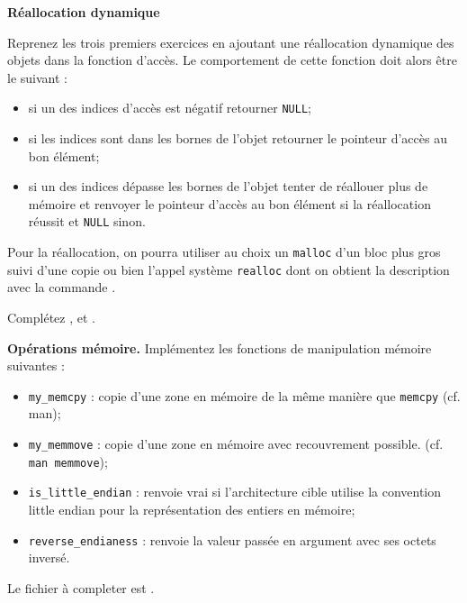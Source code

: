 \documentclass[10pt]{article}\usepackage[nu]{esial}
\begin{document}
\begin{Exercice} \textbf{Réallocation dynamique}

  Reprenez les trois premiers exercices en ajoutant une réallocation dynamique
  des objets dans la fonction d'accès. Le comportement de cette fonction doit
  alors être le suivant :
  \begin{itemize}
  \item si un des indices d'accès est négatif retourner \texttt{NULL};
  \item si les indices sont dans les bornes de l'objet retourner le pointeur
    d'accès au bon élément;
  \item si un des indices dépasse les bornes de l'objet tenter de réallouer
    plus de mémoire et renvoyer le pointeur d'accès au bon élément si la
    réallocation réussit et \texttt{NULL} sinon.
  \end{itemize}
  
  Pour la réallocation, on pourra utiliser au choix un \texttt{malloc} d'un
  bloc plus gros suivi d'une copie ou bien l'appel système \texttt{realloc}
  dont on obtient la description avec la commande .

  Complétez ,  et
  .
\end{Exercice}

\begin{Exercice}\textbf{Opérations mémoire.}
Implémentez les fonctions de manipulation mémoire suivantes :
\begin{itemize}
\item \texttt{my\_memcpy} : copie d'une zone en mémoire de la même manière que
  \texttt{memcpy} (cf. man);
\item \texttt{my\_memmove} : copie d'une zone en mémoire avec recouvrement
  possible.  (cf. \texttt{man memmove});
\item \texttt{is\_little\_endian} : renvoie vrai si l'architecture cible
  utilise la convention little endian pour la représentation des entiers en
  mémoire;
\item \texttt{reverse\_endianess} : renvoie la valeur passée en argument avec
  ses octets inversé.
\end{itemize}
  Le fichier à completer est . 
\end{Exercice}
\end{document}
